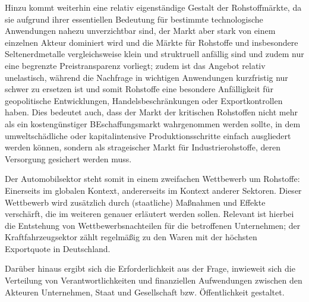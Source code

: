 \documentclass[12pt,a4paper,oneside]{book} %
\begin{document}
	Hinzu kommt weiterhin eine relativ eigenständige Gestalt der Rohstoffmärkte, da sie aufgrund ihrer essentiellen Bedeutung für bestimmte technologische Anwendungen nahezu unverzichtbar sind, der Markt aber stark von einem einzelnen Akteur dominiert wird und die Märkte für Rohstoffe und insbesondere Seltenerdmetalle vergleichsweise klein und struktruell anfällig sind und zudem nur eine begrenzte Preistransparenz vorliegt; zudem ist das Angebot relativ unelastisch, während die Nachfrage in wichtigen Anwendungen kurzfristig nur schwer zu ersetzen ist und somit Rohstoffe eine besondere Anfälligkeit für geopolitische Entwicklungen, Handelsbeschränkungen oder Exportkontrollen haben.\autocite{Applied Resource Policy Lab: The Risks of the Rare Earths Rush, https://arplab.org/insights/the-risks-of-the-rare-earths-rush/} Dies bedeutet auch, dass der Markt der kritischen Rohstoffen nicht mehr als ein kostengünstiger BEschaffungsmarkt wahrgenommen werden sollte, in dem umweltschädliche oder kapitalintensive Produktionsschritte einfach ausgliedert werden können, sondern als strageischer Markt für Industrierohstoffe, deren Versorgung gesichert werden muss.\autocite{Applied Resource Policy Lab: The Risks of the Rare Earths Rush, https://arplab.org/insights/the-risks-of-the-rare-earths-rush/}
	
	Der Automobilsektor steht somit in einem zweifachen Wettbewerb um Rohstoffe: Einerseits im globalen Kontext, andererseits im Kontext anderer Sektoren. Dieser Wettbewerb wird zusätzlich durch (staatliche) Maßnahmen und Effekte verschärft, die im weiteren genauer erläutert werden sollen. Relevant ist hierbei die Entstehung von Wettbewerbsnachteilen für die betroffenen Unternehmen; der Kraftfahrzeugsektor zählt regelmäßig zu den Waren mit der höchsten Exportquote in Deutschland.\autocite{Statistisches Bundesamt, Außenhandelsdaten}
	
	Darüber hinaus ergibt sich die Erforderlichkeit aus der Frage, inwieweit sich die Verteilung von Verantwortlichkeiten und finanziellen Aufwendungen zwischen den Akteuren Unternehmen, Staat und Gesellschaft bzw. Öffentlichkeit gestaltet.
	
\end{document}
